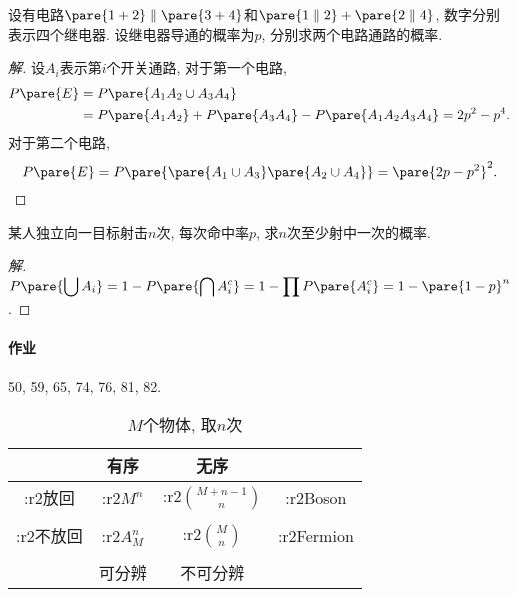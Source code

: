 \documentclass[../Statistics.tex]{subfiles}
\begin{document}
\begin{sample}
    \begin{ex}
        设有电路$\pare{1+2}\parallel\pare{3+4}$和$\pare{1\parallel 2} + \pare{2\parallel 4}$, 数字分别表示四个继电器. 设继电器导通的概率为$p$, 分别求两个电路通路的概率.
    \end{ex}
    \begin{proof}[解]
        设$A_i$表示第$i$个开关通路, 对于第一个电路,
        \begin{align*}
            P\pare{E} &= P\pare{A_1A_2 \cup A_3A_4} \\&= P\pare{A_1A_2} + P\pare{A_3A_4} - P\pare{A_1A_2A_3A_4} = 2p^2 -p^4. 
        \end{align*}
        对于第二个电路,
        \[ P\pare{E} = P\pare{\pare{A_1\cup A_3}\pare{A_2\cup A_4}} = \pare{2p-p^2}^2. \qedhere \]
    \end{proof}
\end{sample}
\begin{sample}
    \begin{ex}
        某人独立向一目标射击$n$次, 每次命中率$p$, 求$n$次至少射中一次的概率.
    \end{ex}
    \begin{proof}[解]
        $\displaystyle P\pare{\bigcup A_i} = 1 - P\pare{\bigcap A_i^c} = 1 - \prod P\pare{A_i^c} = 1 - \pare{1-p}^n$.
    \end{proof}
\end{sample}
\centerline{
}
\paragraph{作业} %
\label{par:作业}

50, 59, 65, 74, 76, 81, 82.


\begin{table}[h]
    \centering
    \begin{tabular}{|c|c|c|c|}
        \hline
        & 有序 & 无序 & \\
        \hline
        \+:r2{放回} & \+:r2{$\displaystyle M^n$} & \+:r2{$\displaystyle \binom{M+n-1}{n}$} & \+:r2{Boson}\\
        &&& \\
        \hline
        \+:r2{不放回} & \+:r2{$\displaystyle A_M^n$} & \+:r2{$\displaystyle \binom{M}{n}$} & \+:r2{Fermion} \\
        &&& \\
        \hline
        &可分辨&不可分辨 & \\ 
        \hline
    \end{tabular}
    \caption{$M$个物体, 取$n$次}
\end{table}


\end{document}
